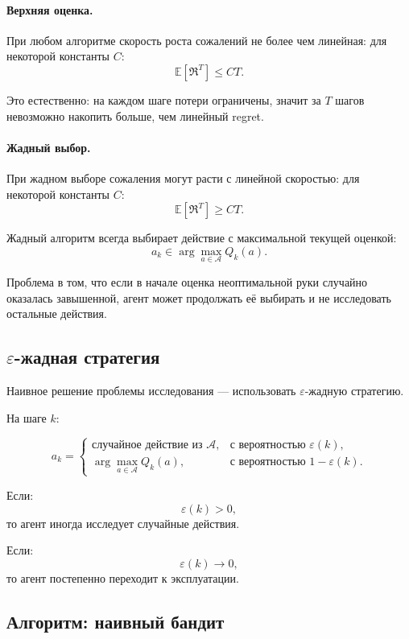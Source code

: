 \documentclass[12pt,a4paper]{article}
\begin{document}
\paragraph{Верхняя оценка.}

При любом алгоритме скорость роста сожалений не более чем линейная: для некоторой константы $C$:
\[
\mathbb E
\left[
\mathfrak R^T
\right]
\le
CT.
\]

Это естественно: на каждом шаге потери ограничены, значит за $T$ шагов невозможно накопить больше, чем линейный regret.

\paragraph{Жадный выбор.}

При жадном выборе сожаления могут расти с линейной скоростью: для некоторой константы $C$:
\[
\mathbb E
\left[
\mathfrak R^T
\right]
\ge
CT.
\]

Жадный алгоритм всегда выбирает действие с максимальной текущей оценкой:
\[
a_k
\in
\arg\max_{a\in\mathcal A}
Q_k(a).
\]

Проблема в том, что если в начале оценка неоптимальной руки случайно оказалась завышенной, агент может продолжать её выбирать и не исследовать остальные действия.

\subsection{$\varepsilon$-жадная стратегия}

Наивное решение проблемы исследования --- использовать $\varepsilon$-жадную стратегию.

На шаге $k$:

\[
a_k=
\begin{cases}
\text{случайное действие из }\mathcal A, & \text{с вероятностью }\varepsilon(k),\\
\arg\max\limits_{a\in\mathcal A} Q_k(a), & \text{с вероятностью }1-\varepsilon(k).
\end{cases}
\]

Если:
\[
\varepsilon(k)>0,
\]
то агент иногда исследует случайные действия.

Если:
\[
\varepsilon(k)\to 0,
\]
то агент постепенно переходит к эксплуатации.

\subsection{Алгоритм: наивный бандит}
\end{document}
